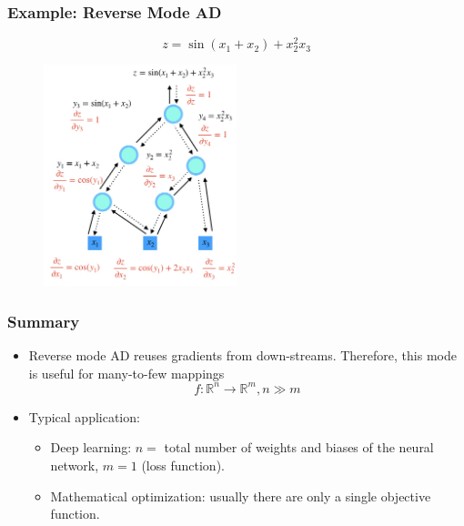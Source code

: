 \documentclass{beamer}
\begin{document}
\begin{frame}
	\frametitle{Example: Reverse Mode AD}
	$$z=\sin(x_1+x_2) + x_2^2x_3$$
	\begin{figure}[hbt]
		\centering
		\includegraphics[width=0.5\textwidth]{figures/bd4}
	\end{figure}
\end{frame}

\begin{frame}
	\frametitle{Summary}

	\begin{itemize}
		\item Reverse mode AD reuses gradients from down-streams. Therefore, this mode is useful for many-to-few mappings
		      $$f:\mathbb{R}^n\rightarrow \mathbb{R}^m, n\gg m$$
		\item Typical application:
		      \begin{itemize}
			      \item Deep learning: $n=$ total number of weights and biases of the neural network, $m=1$ (loss function).
			      \item Mathematical optimization: usually there are only a single objective function.
		      \end{itemize}
	\end{itemize}
\end{frame}
\end{document}
